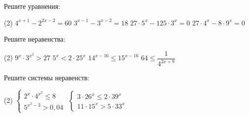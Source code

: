 \begin{homework}[number=3]
	\begin{listofex}
		\item Решите уравнения:
		\begin{tasks}(2)
			\task \( 4^{x+1}-2^{2x-2}=60 \)
			\task \( 3^{x-1}-3^{x-2}=18 \)
			\task \( 27 \cdot 5^x-125 \cdot 3^x=0 \)
			\task \( 27 \cdot 4^x - 8 \cdot 9^x=0 \)
		\end{tasks}
		\item Решите неравенства: %
		\begin{tasks}(2)
			\task \( 9^x \cdot 3^{x^2} > 27 \)
			\task \( 5^x < 2 \cdot 25^x \)
			\task \( 14^{x-16} \le 15^{x-16} \)
			\task \( 64 \le \dfrac{1}{4^{2x+9}} \)
		\end{tasks}
		\item Решите системы неравенств:
		\begin{tasks}(2)
			\task \( \begin{cases} 2^x \cdot 4 ^{x^2} \le 8 \\ 5^{x^2-3} > 0,04 \end{cases} \)
			\task \( \begin{cases} 3 \cdot 26^x \le 2 \cdot 39^x \\ 11 \cdot 15^x > 5 \cdot 33^x \end{cases} \)
		\end{tasks}
	\end{listofex}
\end{homework}
	
